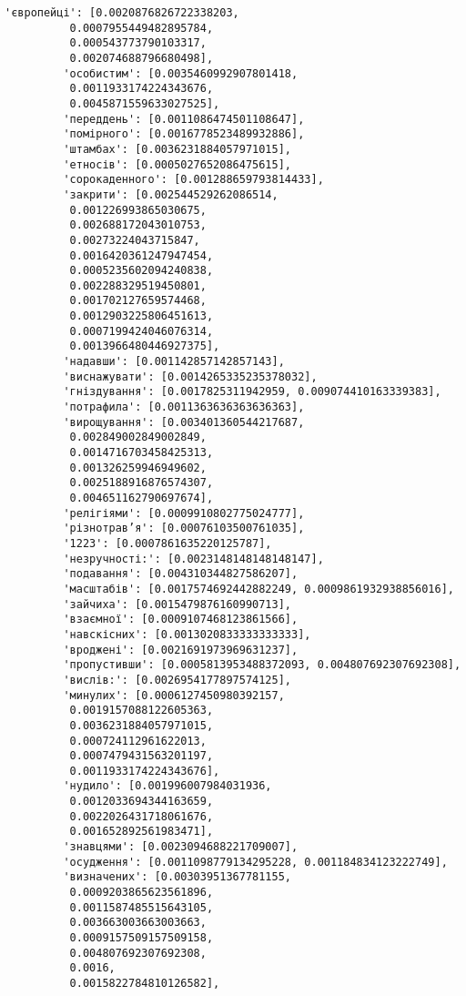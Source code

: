 \documentclass[11pt]{article}
\begin{document}
\begin{Verbatim}[commandchars=\\\{\}]
         'європейці': [0.0020876826722338203,
          0.0007955449482895784,
          0.000543773790103317,
          0.002074688796680498],
         'особистим': [0.0035460992907801418,
          0.0011933174224343676,
          0.0045871559633027525],
         'переддень': [0.0011086474501108647],
         'помірного': [0.0016778523489932886],
         'штамбах': [0.0036231884057971015],
         'етносів': [0.0005027652086475615],
         'сорокаденного': [0.001288659793814433],
         'закрити': [0.002544529262086514,
          0.001226993865030675,
          0.002688172043010753,
          0.00273224043715847,
          0.0016420361247947454,
          0.0005235602094240838,
          0.002288329519450801,
          0.001702127659574468,
          0.0012903225806451613,
          0.0007199424046076314,
          0.0013966480446927375],
         'надавши': [0.001142857142857143],
         'виснажувати': [0.0014265335235378032],
         'гніздування': [0.0017825311942959, 0.009074410163339383],
         'потрафила': [0.0011363636363636363],
         'вирощування': [0.003401360544217687,
          0.002849002849002849,
          0.0014716703458425313,
          0.001326259946949602,
          0.0025188916876574307,
          0.004651162790697674],
         'релігіями': [0.0009910802775024777],
         'різнотрав’я': [0.00076103500761035],
         '1223': [0.0007861635220125787],
         'незручності:': [0.0023148148148148147],
         'подавання': [0.004310344827586207],
         'масштабів': [0.0017574692442882249, 0.0009861932938856016],
         'зайчиха': [0.0015479876160990713],
         'взаємної': [0.0009107468123861566],
         'навскісних': [0.0013020833333333333],
         'вроджені': [0.0021691973969631237],
         'пропустивши': [0.0005813953488372093, 0.004807692307692308],
         'вислів:': [0.0026954177897574125],
         'минулих': [0.0006127450980392157,
          0.0019157088122605363,
          0.0036231884057971015,
          0.000724112961622013,
          0.0007479431563201197,
          0.0011933174224343676],
         'нудило': [0.001996007984031936,
          0.0012033694344163659,
          0.0022026431718061676,
          0.001652892561983471],
         'знавцями': [0.0023094688221709007],
         'осудження': [0.0011098779134295228, 0.001184834123222749],
         'визначених': [0.00303951367781155,
          0.0009203865623561896,
          0.0011587485515643105,
          0.003663003663003663,
          0.0009157509157509158,
          0.004807692307692308,
          0.0016,
          0.0015822784810126582],

\end{Verbatim}
\end{document}
